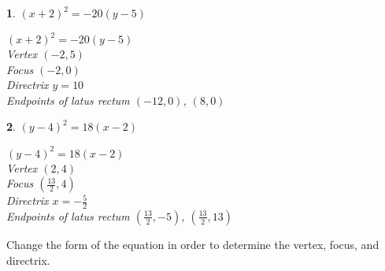 \documentclass{amsbook}
\newtheorem{exc}{}
\newenvironment{ex}{\begin{exc}\normalfont}{\end{exc}}
\numberwithin{section}{chapter}
\numberwithin{equation}{chapter}
\begin{document}
\begin{multicols}{2}
\begin{ex}
	$(x+2)^2 = -20(y-5)$
	\begin{sol}
	{\small $(x+2)^2 = -20(y-5)$}\\
	{\small Vertex $\left(-2, 5\right)$}\\
	{\small Focus $\left(-2, 0 \right)$}\\
	{\small Directrix $y = 10$}\\
	{\small Endpoints of latus rectum $\left(-12, 0 \right)$, $\left(8, 0 \right)$}\\	
	\end{sol}
\end{ex}
\begin{ex}
	$(y-4)^2 = 18(x-2)$
	\begin{sol}
	{\small $(y-4)^2 = 18(x-2)$}\\
	{\small Vertex $\left(2, 4\right)$}\\
	{\small Focus $\left( \frac{13}{2}, 4 \right)$}\\
	{\small Directrix $x = -\frac{5}{2}$}\\
	{\small Endpoints of latus rectum $\left(\frac{13}{2}, -5 \right)$, $\left(\frac{13}{2}, 13 \right)$}\\	
	\end{sol}
\end{ex}
\end{multicols}

Change the form of the equation in order to determine the vertex, focus, and directrix.
\end{document}
